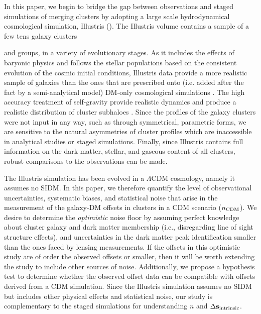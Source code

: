 \documentclass[usenatbib]{mn2e}
\newcommand{\offset}{\Delta {\bf s}}
\begin{document}
In this paper, we begin to bridge the gap between observations and staged simulations of merging clusters by adopting a large scale hydrodynamical cosmological simulation, Illustris (\citealt{Vogelsberger2014, Vogelsberger:2014b, Genel:2014,Sijacki:2015}). 
The Illustris volume contains a sample of a few tens galaxy clusters {and groups, in a variety of evolutionary stages.
%
As it includes the effects of baryonic physics and follows the stellar populations based on the consistent evolution of the cosmic initial conditions, Illustris data provide a more realistic sample of galaxies than the ones that are prescribed onto (i.e. added after the fact by a semi-analytical model) DM-only cosmological simulations \citep[e.g.][]{Harvey2013d}. The high accuracy treatment of self-gravity provide realistic dynamics and produce a realistic distribution of cluster subhaloes \citep{Vogelsberger2014}. Since the profiles of the galaxy clusters were not input in any way, such as through symmetrical, parametric forms, we are sensitive to the natural asymmetries of cluster profiles which are inaccessible in analytical studies or staged simulations. Finally, since Illustris contains full information on the dark matter, stellar, and gaseous content of all clusters, robust comparisons to the observations can be made.

The Illustris simulation has been evolved in a $\Lambda$CDM cosmology, namely it assumes no SIDM. In this paper, we therefore quantify the level of observational uncertainties, systematic biases, and statistical noise that arise in the measurement of the galaxy-DM offsets in clusters in a CDM scenario ($n_{\rm CDM}$). 
We desire to determine the {\it optimistic} noise floor by assuming perfect knowledge about cluster galaxy and dark matter membership (i.e., disregarding line of sight structure effects), and uncertainties in the dark matter peak identification smaller than the ones faced by lensing measurements. If the offsets in this optimistic study are of order the observed offsets or smaller, then it will be worth extending the study to include other sources of noise.
%
Additionally, we propose a hypothesis test to determine whether the observed offset data can be compatible with offsets derived from a CDM simulation. Since the Illustris simulation assumes no SIDM but includes other physical effects and statistical noise, 
our study is complementary to the staged simulations for understanding $n$ and $\offset_{\rm intrinsic}$.


}
\end{document}
